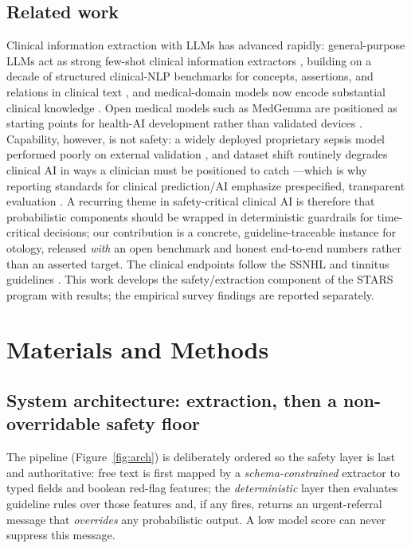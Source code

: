\documentclass[11pt]{article}
\begin{document}
\subsection{Related work}
Clinical information extraction with LLMs has advanced rapidly: general-purpose LLMs act as strong few-shot clinical information extractors \cite{agrawal2022llmextract}, building on a decade of structured clinical-NLP benchmarks for concepts, assertions, and relations in clinical text \cite{uzuner2010i2b2}, and medical-domain models now encode substantial clinical knowledge \cite{singhal2023llmclinical}. Open medical models such as MedGemma are positioned as starting points for health-AI development rather than validated devices \cite{medgemma2025blog,medgemma2026docs}. Capability, however, is not safety: a widely deployed proprietary sepsis model performed poorly on external validation \cite{wong2021sepsis}, and dataset shift routinely degrades clinical AI in ways a clinician must be positioned to catch \cite{finlayson2021datashift}---which is why reporting standards for clinical prediction/AI emphasize prespecified, transparent evaluation \cite{collins2024tripodai}. A recurring theme in safety-critical clinical AI is therefore that probabilistic components should be wrapped in deterministic guardrails for time-critical decisions; our contribution is a concrete, guideline-traceable instance for otology, released \emph{with} an open benchmark and honest end-to-end numbers rather than an asserted target. The clinical endpoints follow the SSNHL and tinnitus guidelines \cite{chandrasekhar2019ssnhl,tunkel2014cpg}. This work develops the safety/extraction component of the STARS program with results; the empirical survey findings are reported separately.

\section{Materials and Methods}
\subsection{System architecture: extraction, then a non-overridable safety floor}
The pipeline (Figure~\ref{fig:arch}) is deliberately ordered so the safety layer is last and authoritative: free text is first mapped by a \emph{schema-constrained} extractor to typed fields and boolean red-flag features; the \emph{deterministic} layer then evaluates guideline rules over those features and, if any fires, returns an urgent-referral message that \emph{overrides} any probabilistic output. A low model score can never suppress this message.
\end{document}
